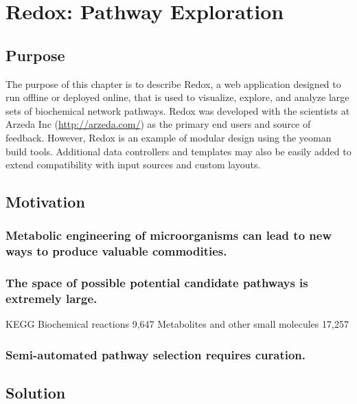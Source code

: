 \chapter{Redox: Pathway Exploration}

\section{Purpose}
The purpose of this chapter is to describe Redox, a web application designed to run offline or deployed online, that is used to visualize, explore, and analyze large sets of biochemical network pathways.
Redox was developed with the scientists at Arzeda Inc (\url{http://arzeda.com/}) as the primary end users and source of feedback.
However, Redox is an example of modular design using the yeoman build tools.
Additional data controllers and templates may also be easily added to extend compatibility with input sources and custom layouts.

\section{Motivation}
\subsection{Metabolic engineering of microorganisms can lead to new ways to produce valuable commodities.}
\subsection{The space of possible potential candidate pathways is extremely large.}
KEGG
Biochemical reactions 9,647
Metabolites and other small molecules 17,257
\subsection{Semi-automated pathway selection requires curation.}


\section{Solution}
\subsection{}
\subsection{}
\subsection{}

